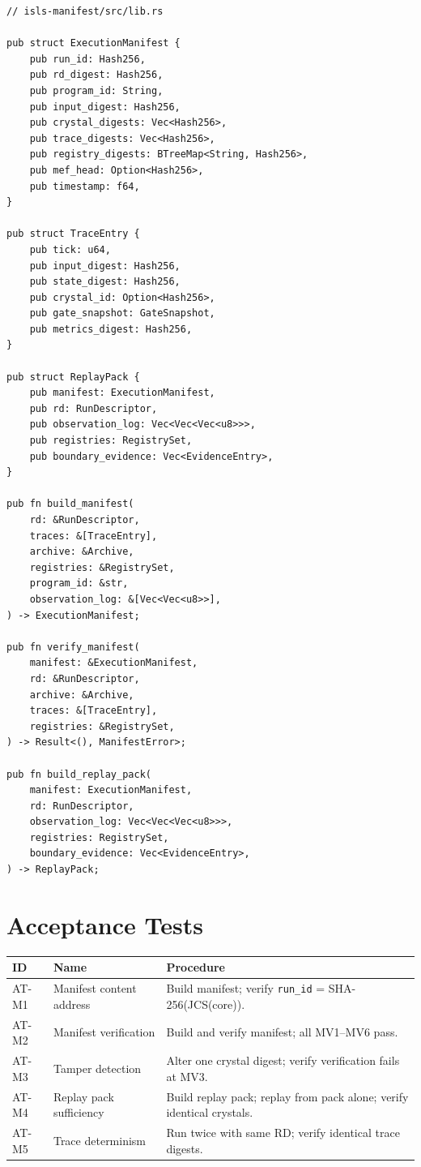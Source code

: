 \documentclass[11pt,a4paper,twoside]{article}
\theoremstyle{definition}
\theoremstyle{plain}
\theoremstyle{remark}
\begin{document}
\begin{verbatim}
// isls-manifest/src/lib.rs

pub struct ExecutionManifest {
    pub run_id: Hash256,
    pub rd_digest: Hash256,
    pub program_id: String,
    pub input_digest: Hash256,
    pub crystal_digests: Vec<Hash256>,
    pub trace_digests: Vec<Hash256>,
    pub registry_digests: BTreeMap<String, Hash256>,
    pub mef_head: Option<Hash256>,
    pub timestamp: f64,
}

pub struct TraceEntry {
    pub tick: u64,
    pub input_digest: Hash256,
    pub state_digest: Hash256,
    pub crystal_id: Option<Hash256>,
    pub gate_snapshot: GateSnapshot,
    pub metrics_digest: Hash256,
}

pub struct ReplayPack {
    pub manifest: ExecutionManifest,
    pub rd: RunDescriptor,
    pub observation_log: Vec<Vec<Vec<u8>>>,
    pub registries: RegistrySet,
    pub boundary_evidence: Vec<EvidenceEntry>,
}

pub fn build_manifest(
    rd: &RunDescriptor,
    traces: &[TraceEntry],
    archive: &Archive,
    registries: &RegistrySet,
    program_id: &str,
    observation_log: &[Vec<Vec<u8>>],
) -> ExecutionManifest;

pub fn verify_manifest(
    manifest: &ExecutionManifest,
    rd: &RunDescriptor,
    archive: &Archive,
    traces: &[TraceEntry],
    registries: &RegistrySet,
) -> Result<(), ManifestError>;

pub fn build_replay_pack(
    manifest: ExecutionManifest,
    rd: RunDescriptor,
    observation_log: Vec<Vec<Vec<u8>>>,
    registries: RegistrySet,
    boundary_evidence: Vec<EvidenceEntry>,
) -> ReplayPack;
\end{verbatim}

\section{Acceptance Tests}\label{sec:man:tests}

\begin{tabularx}{\textwidth}{l l X}
\toprule
\textbf{ID} & \textbf{Name} & \textbf{Procedure} \\
\midrule
AT-M1 & Manifest content address & Build manifest; verify
  \texttt{run\_id} = SHA-256(JCS(core)). \\
AT-M2 & Manifest verification & Build and verify manifest; all MV1--MV6
  pass. \\
AT-M3 & Tamper detection & Alter one crystal digest; verify
  verification fails at MV3. \\
AT-M4 & Replay pack sufficiency & Build replay pack; replay from pack
  alone; verify identical crystals. \\
AT-M5 & Trace determinism & Run twice with same RD; verify identical
  trace digests. \\
\bottomrule
\end{tabularx}
\end{document}
